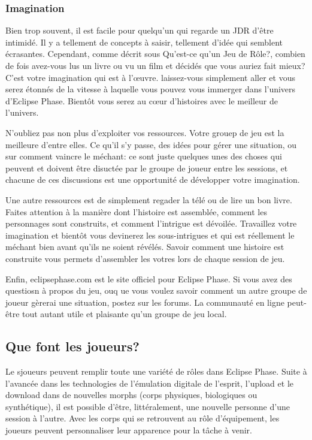 \subsubsection{Imagination} \label{sec:imagination} 

Bien trop souvent, il est facile pour quelqu'un qui regarde un JDR d'être intimidé. Il y a tellement de concepts à saisir, tellement d'idée qui semblent écrasantes. Cependant, comme décrit sous Qu'est-ce qu'un Jeu de Rôle?, combien de fois avez-vous lus un livre ou vu un film et décidés que vous auriez fait mieux? C'est votre imagination qui est à l'œuvre. laissez-vous simplement aller et vous serez étonnés de la vitesse à laquelle vous pouvez vous immerger dans l'univers d'Eclipse Phase. Bientôt vous serez au cœur d'histoires avec le meilleur de l'univers. 

N'oubliez pas non plus d'exploiter vos ressources. Votre grouep de jeu est la meilleure d'entre elles. Ce qu'il s'y passe, des idées pour gérer une situation, ou sur comment vaincre le méchant: ce sont juste quelques unes des choses qui peuvent et doivent être disuctée par le groupe de joueur entre les sessions, et chacune de ces discussions est une opportunité de développer votre imagination. 

Une autre ressources est de simplement regader la télé ou de lire un bon livre. Faites attention à la manière dont l'histoire est assemblée, comment les personnages sont construits, et comment l'intrigue est dévoilée. Travaillez votre imagination et bientôt vous devinerez les sous-intrigues et qui est réellement le méchant bien avant qu'ils ne soient révélés. Savoir comment une histoire est construite vous permets d'assembler les votres lors de chaque session de jeu. 

Enfin, eclipsephase.com est le site officiel pour Eclipse Phase. Si vous avez des questiosn à propos du jeu, ouq ue vous voulez savoir comment un autre groupe de joueur gèrerai une situation, postez sur les forums. La communauté en ligne peut-être tout autant utile et plaisante qu'un groupe de jeu local. 



\subsection{Que font les joueurs?} \label{sec:what-do-players} 

Le sjoueurs peuvent remplir toute une variété de rôles dans Eclipse Phase. Suite à l'avancée dans les technologies de l'émulation digitale de l'esprit, l'upload et le download dans de nouvelles morphs (corps physiques, biologiques ou synthétique), il est possible d'être, littéralement, une nouvelle personne d'une session à l'autre. Avec les corps qui se retrouvent au rôle d'équipement, les joueurs peuvent personnaliser leur apparence pour la tâche à venir. 




